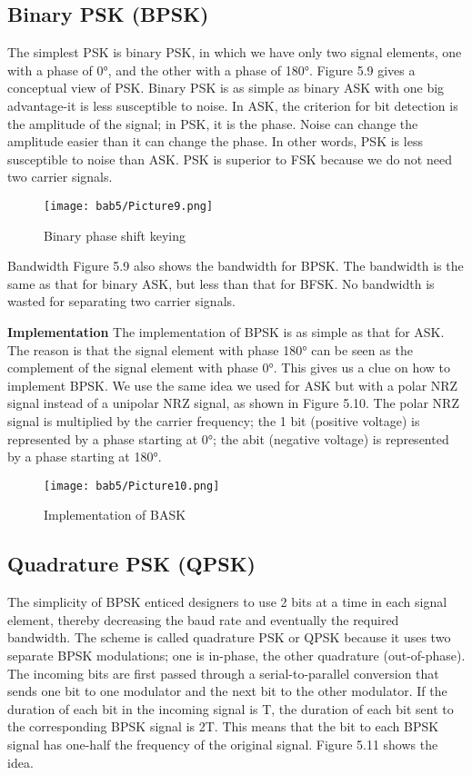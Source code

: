 \subsection*{Binary PSK (BPSK)}
The simplest PSK is binary PSK, in which we have only two signal elements, one with a phase of 0°, and the other with a phase of 180°. Figure 5.9 gives a conceptual view of PSK. Binary PSK is as simple as binary ASK with one big advantage-it is less susceptible to noise. In ASK, the criterion for bit detection is the amplitude of the signal; in PSK, it is the phase. Noise can change the amplitude easier than it can change the phase. In other words, PSK is less susceptible to noise than ASK. PSK is superior to FSK because we do not need two carrier signals.

\begin{figure}
  \centering
  \texttt{[image: bab5/Picture9.png]}
  \caption{Binary phase shift keying}
  \label{fig5:9}
\end{figure}

Bandwidth Figure 5.9 also shows the bandwidth for BPSK. The bandwidth is the same as that for binary ASK, but less than that for BFSK. No bandwidth is wasted for separating two carrier signals.

\textbf{Implementation} The implementation of BPSK is as simple as that for ASK. The reason is that the signal element with phase 180° can be seen as the complement of the signal element with phase 0°. This gives us a clue on how to implement BPSK. We use the same idea we used for ASK but with a polar NRZ signal instead of a unipolar NRZ signal, as shown in Figure 5.10. The polar NRZ signal is multiplied by the carrier frequency; the 1 bit (positive voltage) is represented by a phase starting at 0°; the abit (negative voltage) is represented by a phase starting at 180°.

\begin{figure}
  \centering
  \texttt{[image: bab5/Picture10.png]}
  \caption{Implementation of BASK}
  \label{fig5:10}
\end{figure}

\subsection*{Quadrature PSK (QPSK)}
The simplicity of BPSK enticed designers to use 2 bits at a time in each signal element, thereby decreasing the baud rate and eventually the required bandwidth. The scheme is called quadrature PSK or QPSK because it uses two separate BPSK modulations; one is in-phase, the other quadrature (out-of-phase). The incoming bits are first passed through a serial-to-parallel conversion that sends one bit to one modulator and the next bit to the other modulator. If the duration of each bit in the incoming signal is T, the duration of each bit sent to the corresponding BPSK signal is 2T. This means that the bit to each BPSK signal has one-half the frequency of the original signal. Figure 5.11 shows the idea.

